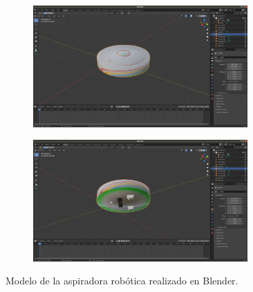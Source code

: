  \begin{figure}[H]
  \begin{subfigure}[b]{0.5\textwidth}
  \centering
    \includegraphics[width=0.9\textwidth, height=0.7\textwidth]{chapters/images/roombablender.png}
    \caption{}
    \label{fig:f1}
  \end{subfigure}
  \hfill
  \begin{subfigure}[b]{0.5\textwidth}
  \centering
    \includegraphics[width=0.9\textwidth, height=0.7\textwidth]{chapters/images/roombablender2.png}
	\caption{}    
    \label{fig:f2}
 
  \end{subfigure}
  \caption{Modelo de la aspiradora robótica  realizado en Blender.}
\end{figure}


